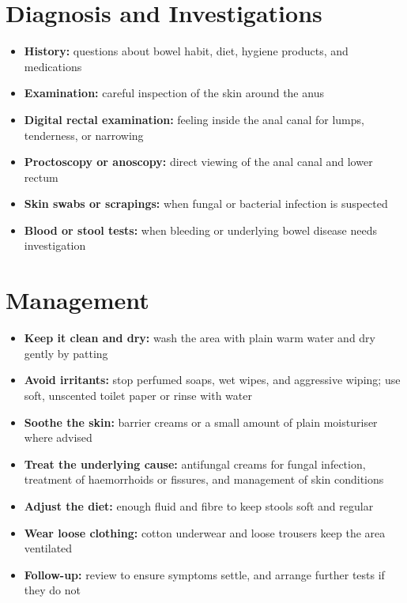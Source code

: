 \section*{Diagnosis and Investigations}
\begin{itemize}
    \item \textbf{History:} questions about bowel habit, diet, hygiene products, and medications
    \item \textbf{Examination:} careful inspection of the skin around the anus
    \item \textbf{Digital rectal examination:} feeling inside the anal canal for lumps, tenderness, or narrowing
    \item \textbf{Proctoscopy or anoscopy:} direct viewing of the anal canal and lower rectum
    \item \textbf{Skin swabs or scrapings:} when fungal or bacterial infection is suspected
    \item \textbf{Blood or stool tests:} when bleeding or underlying bowel disease needs investigation
\end{itemize}

\section*{Management}
\begin{itemize}
    \item \textbf{Keep it clean and dry:} wash the area with plain warm water and dry gently by patting
    \item \textbf{Avoid irritants:} stop perfumed soaps, wet wipes, and aggressive wiping; use soft, unscented toilet paper or rinse with water
    \item \textbf{Soothe the skin:} barrier creams or a small amount of plain moisturiser where advised
    \item \textbf{Treat the underlying cause:} antifungal creams for fungal infection, treatment of haemorrhoids or fissures, and management of skin conditions
    \item \textbf{Adjust the diet:} enough fluid and fibre to keep stools soft and regular
    \item \textbf{Wear loose clothing:} cotton underwear and loose trousers keep the area ventilated
    \item \textbf{Follow-up:} review to ensure symptoms settle, and arrange further tests if they do not
\end{itemize}

